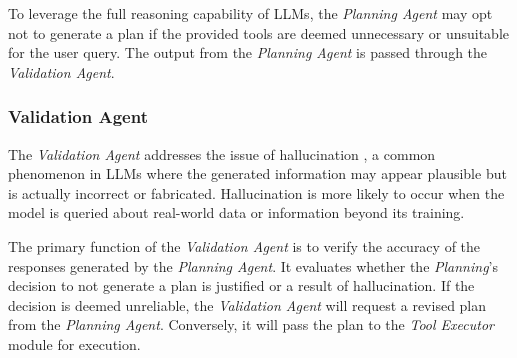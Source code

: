 \documentclass[runningheads]{llncs}
\begin{document}
To leverage the full reasoning capability of LLMs, the \textit{Planning Agent} may opt not to generate a plan if the provided tools are deemed unnecessary or unsuitable for the user query. The output from the \textit{Planning Agent} is passed through the \textit{Validation Agent}.


\subsubsection{Validation Agent}
\label{sec:validator_agent}
The \textit{Validation Agent} addresses the issue of hallucination \cite{10.1145/3571730}, a common phenomenon in LLMs where the generated information may appear plausible but is actually incorrect or fabricated. Hallucination is more likely to occur when the model is queried about real-world data or information beyond its training.



The primary function of the \textit{Validation Agent} is to verify the accuracy of the responses generated by the \textit{Planning Agent}. It evaluates whether the \textit{Planning}'s decision to not generate a plan is justified or a result of hallucination. If the decision is deemed unreliable, the \textit{Validation Agent} will request a revised plan from the \textit{Planning Agent}. Conversely, it will pass the plan to the \textit{Tool Executor} module for execution.
\end{document}
